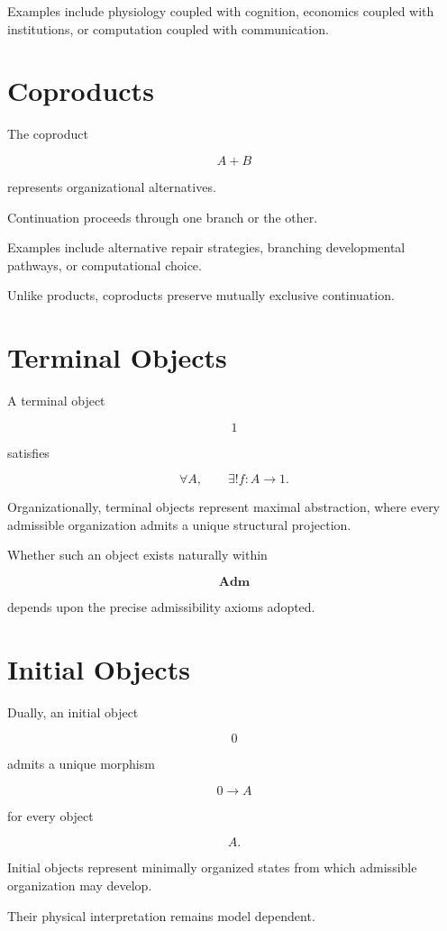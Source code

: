 \documentclass[11pt,oneside]{book}
\numberwithin{equation}{chapter}
\theoremstyle{definition}
\theoremstyle{plain}
\begin{document}
Examples include physiology coupled with cognition, economics coupled
with institutions, or computation coupled with communication.

\section{Coproducts}

The coproduct

\[
A
+
B
\]

represents organizational alternatives.

Continuation proceeds through one branch or the other.

Examples include alternative repair strategies, branching developmental
pathways, or computational choice.

Unlike products, coproducts preserve mutually exclusive continuation.

\section{Terminal Objects}

A terminal object

\[
1
\]

satisfies

\[
\forall A,
\qquad
\exists !
f
:
A
\rightarrow
1.
\]

Organizationally, terminal objects represent maximal abstraction, where
every admissible organization admits a unique structural projection.

Whether such an object exists naturally within

\[
\mathbf{Adm}
\]

depends upon the precise admissibility axioms adopted.

\section{Initial Objects}

Dually, an initial object

\[
0
\]

admits a unique morphism

\[
0
\rightarrow
A
\]

for every object

\[
A.
\]

Initial objects represent minimally organized states from which
admissible organization may develop.

Their physical interpretation remains model dependent.
\end{document}
